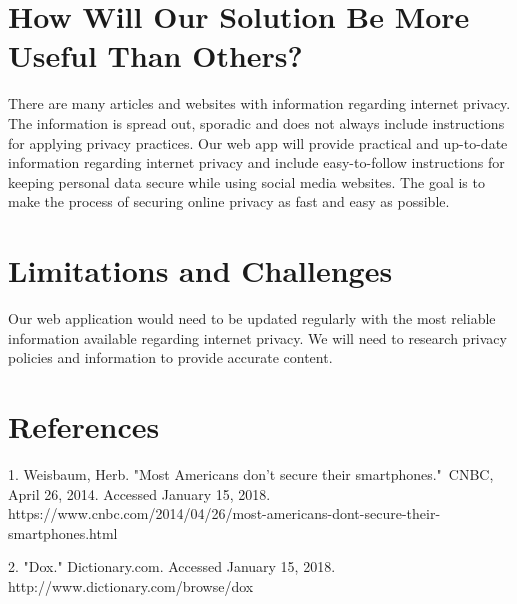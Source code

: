 \documentclass[12pt]{article}
\begin{document}
\section{How Will Our Solution Be More Useful Than Others?}
There are many articles and websites with information regarding internet privacy. The information is spread out, sporadic and does not always include instructions for applying privacy practices. Our web app will provide practical and up-to-date information regarding internet privacy and include easy-to-follow instructions for keeping personal data secure while using social media websites. The goal is to make the process of securing online privacy as fast and easy as possible.

\section{Limitations and Challenges}
Our web application would need to be updated regularly with the most reliable information available regarding internet privacy. We will need to research privacy policies and information to provide accurate content.

\section{References}
1. Weisbaum, Herb. "Most Americans don't secure their smartphones." CNBC, April 26, 2014. Accessed January 15, 2018. https://www.cnbc.com/2014/04/26/most-americans-dont-secure-their-smartphones.html \par 2. "Dox." Dictionary.com. Accessed January 15, 2018. http://www.dictionary.com/browse/dox





\printbibliography
\end{document}
